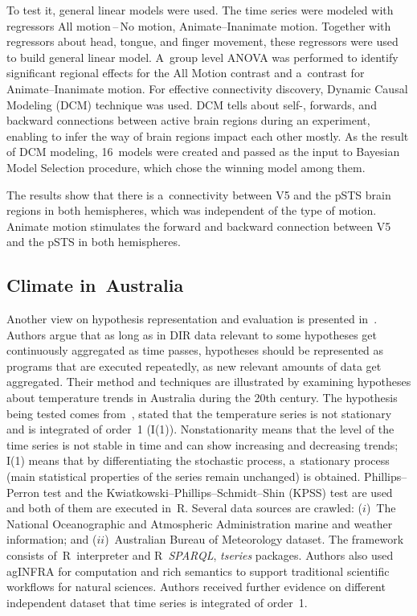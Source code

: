 \begin{multicols}{2}
  To test it, general linear models were used. The time series were modeled with
regressors All motion\,--\,No motion, Animate--Inanimate motion. Together with
regressors about head, tongue, and finger movement, these regressors were used to
build general linear model. A~group level ANOVA was performed to identify
significant regional effects for the All Motion contrast and a~contrast for
Animate--Inanimate motion. For effective connectivity discovery,
 Dynamic Causal Modeling
(DCM) technique was used. DCM tells about self-, forwards, and
backward connections between active brain regions during an experiment, enabling
to infer the way of brain regions impact each other mostly. As the result of DCM
modeling, 16~models were created and passed as the input to Bayesian Model
Selection procedure, which chose the winning model among them.
{

}

  The results show that there is a~connectivity between V5 and the pSTS brain
regions in both hemispheres, which was independent of the type of motion. Animate
motion stimulates the forward and backward connection between V5 and the pSTS in
both hemispheres.

\subsection{Climate in~Australia}

\noindent
  Another view on hypothesis representation and evaluation is presented
  in~\cite{73-kl}. Authors argue that as long as in DIR data relevant to some
hypotheses get continuously aggregated as time passes, hypotheses should be
represented as programs that are executed repeatedly, as new relevant amounts of
data get aggregated. Their method and techniques are illustrated by examining
hypotheses about temperature trends in Australia during the 20th century. The
hypothesis being tested comes from~\cite{74-kl}, stated that the temperature series is
not stationary and is integrated of order~1 (I(1)). Nonstationarity means that the
level of the time series is not stable in time and can show increasing and decreasing
trends; I(1) means that by differentiating the stochastic process,
a~stationary process
(main statistical properties of the series remain unchanged) is obtained. Phillips--Perron test and the Kwiatkowski--Phillips--Schmidt--Shin (KPSS) test are used and
both of them are executed in~R. Several data sources are crawled: ($i$)~The National
Oceanographic and Atmospheric Administration marine and weather information; and
($ii$)~Australian Bureau of Meteorology dataset. The framework consists
of~R~interpreter and R~\textit{SPARQL}, \textit{tseries} packages. Authors also
used \mbox{agINFRA} for computation and rich semantics to support traditional scientific
workflows for natural sciences. Authors received further evidence on different
independent dataset that time series is integrated of order~1.


\end{multicols}

